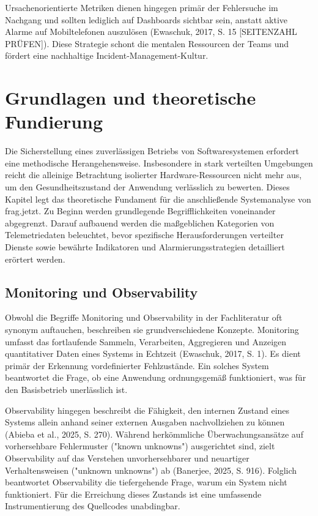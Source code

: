 Ursachenorientierte Metriken dienen hingegen primär der Fehlersuche im Nachgang und sollten lediglich auf Dashboards sichtbar sein, anstatt aktive Alarme auf Mobiltelefonen auszulösen (Ewaschuk, 2017, S. 15 [SEITENZAHL PRÜFEN]). Diese Strategie schont die mentalen Ressourcen der Teams und fördert eine nachhaltige Incident-Management-Kultur.


\section{Grundlagen und theoretische Fundierung}

Die Sicherstellung eines zuverlässigen Betriebs von Softwaresystemen erfordert eine methodische Herangehensweise. Insbesondere in stark verteilten Umgebungen reicht die alleinige Betrachtung isolierter Hardware-Ressourcen nicht mehr aus, um den Gesundheitszustand der Anwendung verlässlich zu bewerten. Dieses Kapitel legt das theoretische Fundament für die anschließende Systemanalyse von frag.jetzt. Zu Beginn werden grundlegende Begrifflichkeiten voneinander abgegrenzt. Darauf aufbauend werden die maßgeblichen Kategorien von Telemetriedaten beleuchtet, bevor spezifische Herausforderungen verteilter Dienste sowie bewährte Indikatoren und Alarmierungsstrategien detailliert erörtert werden.

\subsection{Monitoring und Observability}

Obwohl die Begriffe Monitoring und Observability in der Fachliteratur oft synonym auftauchen, beschreiben sie grundverschiedene Konzepte. Monitoring umfasst das fortlaufende Sammeln, Verarbeiten, Aggregieren und Anzeigen quantitativer Daten eines Systems in Echtzeit (Ewaschuk, 2017, S. 1). Es dient primär der Erkennung vordefinierter Fehlzustände. Ein solches System beantwortet die Frage, ob eine Anwendung ordnungsgemäß funktioniert, was für den Basisbetrieb unerlässlich ist.

Observability hingegen beschreibt die Fähigkeit, den internen Zustand eines Systems allein anhand seiner externen Ausgaben nachvollziehen zu können (Abieba et al., 2025, S. 270). Während herkömmliche Überwachungsansätze auf vorhersehbare Fehlermuster ("known unknowns") ausgerichtet sind, zielt Observability auf das Verstehen unvorhersehbarer und neuartiger Verhaltensweisen ("unknown unknowns") ab (Banerjee, 2025, S. 916). Folglich beantwortet Observability die tiefergehende Frage, warum ein System nicht funktioniert. Für die Erreichung dieses Zustands ist eine umfassende Instrumentierung des Quellcodes unabdingbar.

